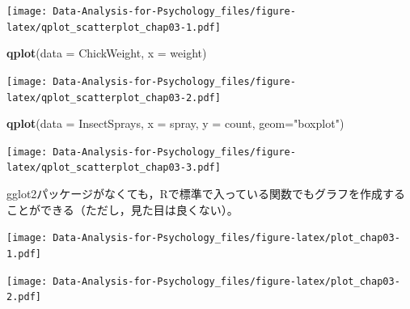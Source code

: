 \documentclass[]{article}
\newenvironment{Shaded}{\begin{snugshade}}{\end{snugshade}}
\newcommand{\KeywordTok}[1]{\textcolor[rgb]{0.13,0.29,0.53}{\textbf{#1}}}
\newcommand{\DataTypeTok}[1]{\textcolor[rgb]{0.13,0.29,0.53}{#1}}
\newcommand{\StringTok}[1]{\textcolor[rgb]{0.31,0.60,0.02}{#1}}
\newcommand{\OperatorTok}[1]{\textcolor[rgb]{0.81,0.36,0.00}{\textbf{#1}}}
\newcommand{\NormalTok}[1]{#1}
\begin{document}
\texttt{[image: Data-Analysis-for-Psychology\_files/figure-latex/qplot\_scatterplot\_chap03-1.pdf]}

\begin{Shaded}
\begin{Highlighting}[]
\KeywordTok{qplot}\NormalTok{(}\DataTypeTok{data =}\NormalTok{ ChickWeight, }\DataTypeTok{x =}\NormalTok{ weight)}
\end{Highlighting}
\end{Shaded}

\texttt{[image: Data-Analysis-for-Psychology\_files/figure-latex/qplot\_scatterplot\_chap03-2.pdf]}

\begin{Shaded}
\begin{Highlighting}[]
\KeywordTok{qplot}\NormalTok{(}\DataTypeTok{data =}\NormalTok{ InsectSprays, }\DataTypeTok{x =}\NormalTok{ spray, }\DataTypeTok{y =}\NormalTok{ count, }\DataTypeTok{geom=}\StringTok{"boxplot"}\NormalTok{)}
\end{Highlighting}
\end{Shaded}

\texttt{[image: Data-Analysis-for-Psychology\_files/figure-latex/qplot\_scatterplot\_chap03-3.pdf]}

gglot2パッケージがなくても，Rで標準で入っている関数でもグラフを作成することができる（ただし，見た目は良くない）。

\begin{Shaded}
\end{Shaded}

\texttt{[image: Data-Analysis-for-Psychology\_files/figure-latex/plot\_chap03-1.pdf]}

\begin{Shaded}
\end{Shaded}

\texttt{[image: Data-Analysis-for-Psychology\_files/figure-latex/plot\_chap03-2.pdf]}

\begin{Shaded}
\end{Shaded}
\end{document}
